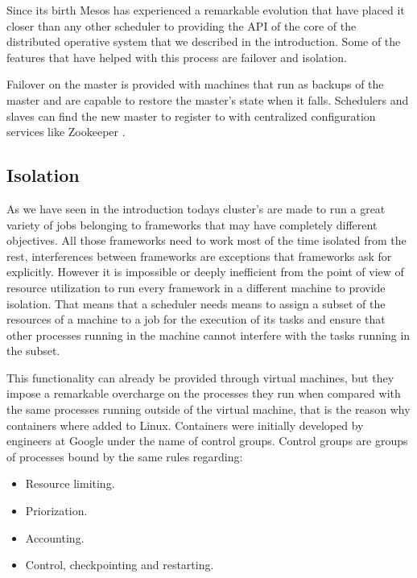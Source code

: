 \documentclass{report}                     %
\begin{document}
Since its birth Mesos has experienced a remarkable evolution that have
placed it closer than any other scheduler to providing the API of the
core of the distributed operative system that we described in the
introduction. Some of the features that have helped with this process
are failover and isolation.

Failover on the master is provided with machines that run as backups of the master and
are capable to restore the master's state when it falls. Schedulers and slaves can find
the new master to register to with centralized configuration services like Zookeeper \cite{_apache_????}.

\subsection{Isolation}

As we have seen in the introduction todays cluster's are made to run a
great variety of jobs belonging to frameworks that may have completely
different objectives. All those frameworks need to work most of the
time isolated from the rest, interferences between frameworks are
exceptions that frameworks ask for explicitly. However it is
impossible or deeply inefficient from the point of view of resource
utilization to run every framework in a different machine to provide
isolation. That means that a scheduler needs means to assign a subset
of the resources of a machine to a job for the execution of its tasks
and ensure that other processes running in the machine cannot
interfere with the tasks running in the subset.

This functionality can already be provided through virtual machines,
but they impose a remarkable overcharge on the processes they run when
compared with the same processes running outside of the virtual
machine, that is the reason why containers where added to
Linux. Containers were initially developed by engineers at Google
under the name of control groups. Control groups are groups of
processes bound by the same rules regarding: \\

\begin{itemize}
  \item Resource limiting.
  \item Priorization.
  \item Accounting.
  \item Control, checkpointing and restarting.
\end{itemize}
\end{document}
